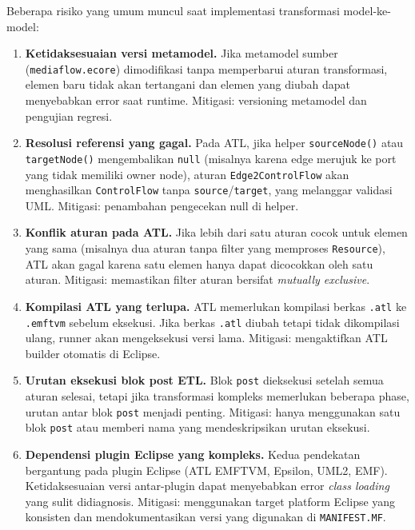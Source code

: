 Beberapa risiko yang umum muncul saat implementasi transformasi model-ke-model:
\begin{enumerate}
  \item \textbf{Ketidaksesuaian versi metamodel.} Jika metamodel sumber (\texttt{mediaflow.ecore}) dimodifikasi tanpa memperbarui aturan transformasi, elemen baru tidak akan tertangani dan elemen yang diubah dapat menyebabkan error saat runtime. Mitigasi: versioning metamodel dan pengujian regresi.

  \item \textbf{Resolusi referensi yang gagal.} Pada ATL, jika helper \texttt{sourceNode()} atau \texttt{targetNode()} mengembalikan \texttt{null} (misalnya karena edge merujuk ke port yang tidak memiliki owner node), aturan \texttt{Edge2ControlFlow} akan menghasilkan \texttt{ControlFlow} tanpa \texttt{source}/\texttt{target}, yang melanggar validasi UML. Mitigasi: penambahan pengecekan null di helper.

  \item \textbf{Konflik aturan pada ATL.} Jika lebih dari satu aturan cocok untuk elemen yang sama (misalnya dua aturan tanpa filter yang memproses \texttt{Resource}), ATL akan gagal karena satu elemen hanya dapat dicocokkan oleh satu aturan. Mitigasi: memastikan filter aturan bersifat \textit{mutually exclusive}.

  \item \textbf{Kompilasi ATL yang terlupa.} ATL memerlukan kompilasi berkas \texttt{.atl} ke \texttt{.emftvm} sebelum eksekusi. Jika berkas \texttt{.atl} diubah tetapi tidak dikompilasi ulang, runner akan mengeksekusi versi lama. Mitigasi: mengaktifkan ATL builder otomatis di Eclipse.

  \item \textbf{Urutan eksekusi blok post ETL.} Blok \texttt{post} dieksekusi setelah semua aturan selesai, tetapi jika transformasi kompleks memerlukan beberapa phase, urutan antar blok \texttt{post} menjadi penting. Mitigasi: hanya menggunakan satu blok \texttt{post} atau memberi nama yang mendeskripsikan urutan eksekusi.

  \item \textbf{Dependensi plugin Eclipse yang kompleks.} Kedua pendekatan bergantung pada plugin Eclipse (ATL EMFTVM, Epsilon, UML2, EMF). Ketidaksesuaian versi antar-plugin dapat menyebabkan error \textit{class loading} yang sulit didiagnosis. Mitigasi: menggunakan target platform Eclipse yang konsisten dan mendokumentasikan versi yang digunakan di \texttt{MANIFEST.MF}.
\end{enumerate}

